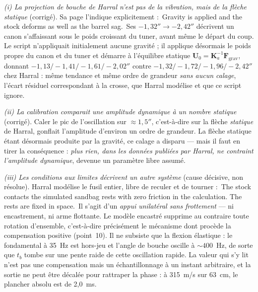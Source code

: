 \documentclass[12pt,a4paper]{article}
\begin{document}
	\emph{(i) La projection de bouche de Harral n'est pas de la vibration, mais de la flèche statique} (corrigé). Sa page l'indique explicitement : \og\,Gravity is applied and the stock deforms as well as the barrel sag.\,\fg{} Ses $-1{,}32''\to-2{,}42''$ décrivent un canon s'affaissant sous le poids croissant du tuner, avant même le départ du coup. Le script n'appliquait initialement aucune gravité ; il applique désormais le poids propre du canon et du tuner et démarre à l'équilibre statique $\mathbf{U}_0 = \mathbf{K}_a^{-1}\mathbf{F}_\text{grav}$, donnant $-1{,}13 / -1{,}41 / -1{,}61 / -2{,}02''$ contre $-1{,}32 / -1{,}72 / -1{,}96 / -2{,}42''$ chez Harral : même tendance et même ordre de grandeur \emph{sans aucun calage}, l'écart résiduel correspondant à la crosse, que Harral modélise et que ce script ignore.

	\emph{(ii) La calibration comparait une amplitude dynamique à un nombre statique} (corrigé). Caler le pic de l'oscillation sur $\approx 1{,}5''$, c'est-à-dire sur la flèche \emph{statique} de Harral, gonflait l'amplitude d'environ un ordre de grandeur. La flèche statique étant désormais produite par la gravité, ce calage a disparu --- mais il faut en tirer la conséquence : \emph{plus rien, dans les données publiées par Harral, ne contraint l'amplitude dynamique}, devenue un paramètre libre assumé.

	\emph{(iii) Les conditions aux limites décrivent un autre système} (cause décisive, non résolue). Harral modélise le fusil entier, libre de reculer et de tourner : \og\,The stock contacts the simulated sandbag rests with zero friction in the calculation. The rests are fixed in space.\,\fg{} Il s'agit d'un \emph{appui unilatéral sans frottement} --- ni encastrement, ni arme flottante. Le modèle encastré supprime au contraire toute rotation d'ensemble, c'est-à-dire précisément le mécanisme dont procède la compensation positive (point~10). Il ne subsiste que la flexion élastique : le fondamental à 35~Hz est hors-jeu et l'angle de bouche oscille à $\sim 400$~Hz, de sorte que $t_b$ tombe sur une pente raide de cette oscillation rapide. La valeur qui s'y lit n'est pas une compensation mais un échantillonnage à un instant arbitraire, et la sortie ne peut être décalée pour rattraper la phase : à 315~m/s sur 63~cm, le plancher absolu est de 2,0~ms.
\end{document}
